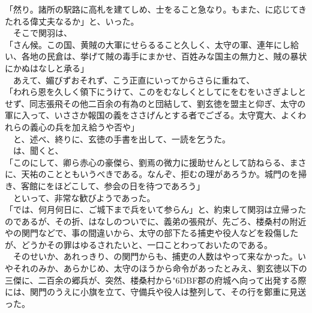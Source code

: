 \documentclass[
  paper=a5,
  fontsize=10pt,
  jafontsize=9.5pt,
  tate,                  %
  open_bracket_pos=nibu, %
]{jlreq}
\begin{document}
「然り。諸所の駅路に高札を建てしめ、士をること急なり。もまた、に応じてきたれる偉丈夫なるか」と、いった。\\


　そこで関羽は、\\


「さん候。この国、黄賊の大軍にせらるること久しく、太守の軍、連年にし給い、各地の民倉は、挙げて賊の毒手にまかせ、百姓みな国主の無力と、賊の暴状にかぬはなしと承る」\\


　あえて、媚びずおそれず、こう正直にいってからさらに重ねて、\\


「われら恩を久しく領下にうけて、このをむなしくとしてにをむをいさぎよしとせず、同志張飛その他二百余の有為のと団結して、劉玄徳を盟主と仰ぎ、太守の軍に入って、いささか報国の義をささげんとする者でござる。太守寛大、よくわれらの義心の兵を加え給うや否や」\\


　と、述べ、終りに、玄徳の手書を出して、一読を乞うた。\\


　は、聞くと、\\


「このにして、卿ら赤心の豪傑ら、劉焉の微力に援助せんとして訪ねらる、まさに、天祐のことともいうべきである。なんぞ、拒むの理があろうか。城門のを掃き、客館にをほどこして、参会の日を待つであろう」\\


　といって、非常な歓びようであった。\\


「では、何月何日に、ご城下まで兵をいて参らん」と、約束して関羽は立帰ったのであるが、その折、はなしのついでに、義弟の張飛が、先ごろ、楼桑村の附近やの関門などで、事の間違いから、太守の部下たる捕吏や役人などを殺傷したが、どうかその罪はゆるされたいと、一口ことわっておいたのである。\\


　そのせいか、あれっきり、の関門からも、捕吏の人数はやって来なかった。いやそれのみか、あらかじめ、太守のほうから命令があったとみえ、劉玄徳以下の三傑に、二百余の郷兵が、突然、楼桑村から{\char"6DBF}郡の府城へ向って出発する際には、関門のうえに小旗を立て、守備兵や役人は整列して、その行を鄭重に見送った。\\
\end{document}
